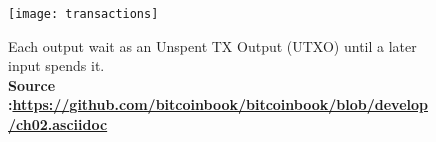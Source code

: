 \begin{figure}[!htbp]
    \centering
    \texttt{[image: transactions]}
    \caption[Each output wait as an Unspent TX Output (UTXO) until a later input spends it]
    {Each output wait as an Unspent TX Output (UTXO) until a later input spends it. \\  \textbf{Source :\url{https://github.com/bitcoinbook/bitcoinbook/blob/develop/ch02.asciidoc}}
    }
    \label{fig:transaction}
\end{figure}
    